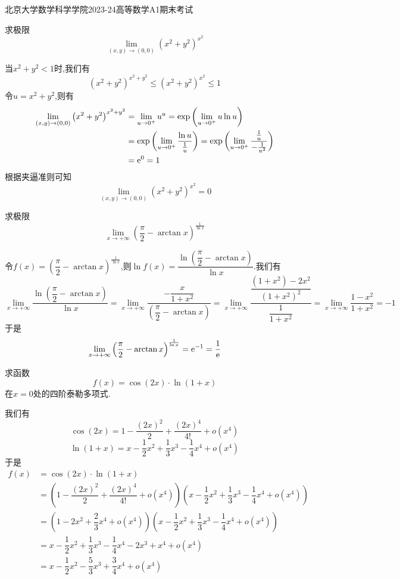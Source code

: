 \documentclass{ctexart}
\begin{document}
\pagestyle{empty}
\begin{center}\Large
    北京大学数学科学学院2023-24高等数学A1期末考试
\end{center}
\begin{problem}[1.(11\songti{分})]
    求极限\[\lim_{(x,y)\to(0,0)}\left(x^2+y^2\right)^{x^2}\]
\end{problem}
\begin{solution}
    当$x^2+y^2<1$时,我们有
    \[\left(x^2+y^2\right)^{x^2+y^2}\leqslant\left(x^2+y^2\right)^{x^2}\leqslant 1\]
    令$u=x^2+y^2$,则有
    \[\begin{aligned}
        \lim_{(x,y)\to(0,0)}\left(x^2+y^2\right)^{x^2+y^2}
        &= \lim_{u\to0^+}u^u = \text{exp}\left(\lim_{u\to0^+}u\ln u\right) \\
        &= \text{exp}\left(\lim_{u\to0^+}\dfrac{\ln u}{\frac{1}{u}}\right)=\text{exp}\left(\lim_{u\to0^+}\dfrac{\frac{1}{u}}{-\frac{1}{u^2}}\right) \\
        &= \mathrm{e}^0=1
    \end{aligned}\]
    根据夹逼准则可知
    \[\lim_{(x,y)\to(0,0)}\left(x^2+y^2\right)^{x^2}=0\]
\end{solution}
\begin{problem}[2.(11\songti{分})]
    求极限\[\lim_{x\to+\infty}\left(\dfrac{\pi}{2}-\arctan x\right)^{\frac{1}{\ln x}}\]
\end{problem}
\begin{solution}
    令$f(x)=\left(\dfrac\pi2-\arctan x\right)^{\frac{1}{\ln x}}$,则$\ln f(x)=\dfrac{\ln\left(\dfrac{\pi}{2}-\arctan x\right)}{\ln x}$.我们有
    \[\lim_{x\to+\infty}\dfrac{\ln\left(\dfrac{\pi}{2}-\arctan x\right)}{\ln x}
        =\lim_{x\to+\infty}\dfrac{-\dfrac{x}{1+x^2}}{\left(\dfrac{\pi}{2}-\arctan x\right)}
        =\lim_{x\to+\infty}\dfrac{\dfrac{\left(1+x^2\right)-2x^2}{\left(1+x^2\right)^2}}{\dfrac{1}{1+x^2}}
        =\lim_{x\to+\infty}\dfrac{1-x^2}{1+x^2}
        =-1
    \]于是
    \[\lim_{x\to+\infty}\left(\dfrac{\pi}{2}-\arctan x\right)^{\frac{1}{\ln x}}=\mathrm{e}^{-1}=\dfrac{1}{\mathrm{e}}\]
\end{solution}
\begin{problem}[3.(11\songti{分})]
    求函数\[f(x)=\cos(2x)\cdot\ln(1+x)\]在$x=0$处的四阶泰勒多项式.
\end{problem}
\begin{solution}
    我们有
    \[\cos(2x)=1-\dfrac{(2x)^2}{2}+\dfrac{(2x)^4}{4!}+o(x^4)\]
    \[\ln(1+x)=x-\dfrac12x^2+\dfrac13x^3-\dfrac14x^4+o(x^4)\]
    于是
    \[\begin{aligned}
        f(x)
        &= \cos(2x)\cdot\ln(1+x) \\
        &= \left(1-\dfrac{(2x)^2}{2}+\dfrac{(2x)^4}{4!}+o(x^4)\right)\left(x-\dfrac12x^2+\dfrac13x^3-\dfrac14x^4+o(x^4)\right) \\
        &= \left(1-2x^2+\dfrac23x^4+o(x^4)\right)\left(x-\dfrac12x^2+\dfrac13x^3-\dfrac14x^4+o(x^4)\right) \\
        &= x-\dfrac12x^2+\dfrac13x^3-\dfrac14x^4-2x^3+x^4+o(x^4) \\
        &= x-\dfrac12x^2-\dfrac53x^3+\dfrac34x^4+o(x^4)
    \end{aligned}\]
\end{solution}
\end{document}
